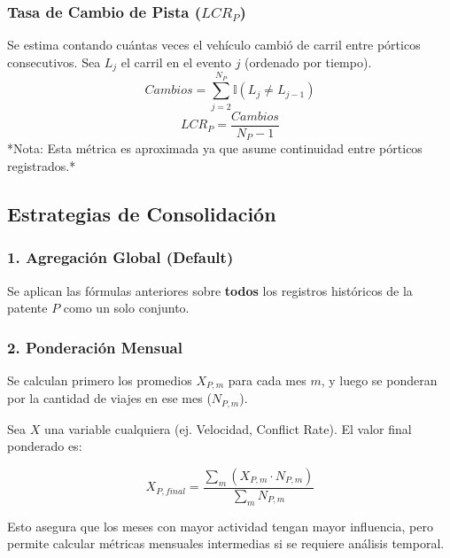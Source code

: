 \subsubsection{Tasa de Cambio de Pista ($LCR_P$)}
Se estima contando cuántas veces el vehículo cambió de carril entre pórticos consecutivos. Sea $L_j$ el carril en el evento $j$ (ordenado por tiempo).
\begin{equation}
    Cambios = \sum_{j=2}^{N_P} \mathbb{I}(L_j \neq L_{j-1})
\end{equation}
\begin{equation}
    LCR_P = \frac{Cambios}{N_P - 1}    
\end{equation}
*Nota: Esta métrica es aproximada ya que asume continuidad entre pórticos registrados.*

\subsection{Estrategias de Consolidación}

\subsubsection{1. Agregación Global (Default)}
Se aplican las fórmulas anteriores sobre \textbf{todos} los registros históricos de la patente $P$ como un solo conjunto.

\subsubsection{2. Ponderación Mensual}
Se calculan primero los promedios $X_{P, m}$ para cada mes $m$, y luego se ponderan por la cantidad de viajes en ese mes ($N_{P, m}$).

Sea $X$ una variable cualquiera (ej. Velocidad, Conflict Rate). El valor final ponderado es:

\begin{equation}
    X_{P, final} = \frac{\sum_{m} \left( X_{P, m} \cdot N_{P, m} \right)}{\sum_{m} N_{P, m}}
\end{equation}

Esto asegura que los meses con mayor actividad tengan mayor influencia, pero permite calcular métricas mensuales intermedias si se requiere análisis temporal.

